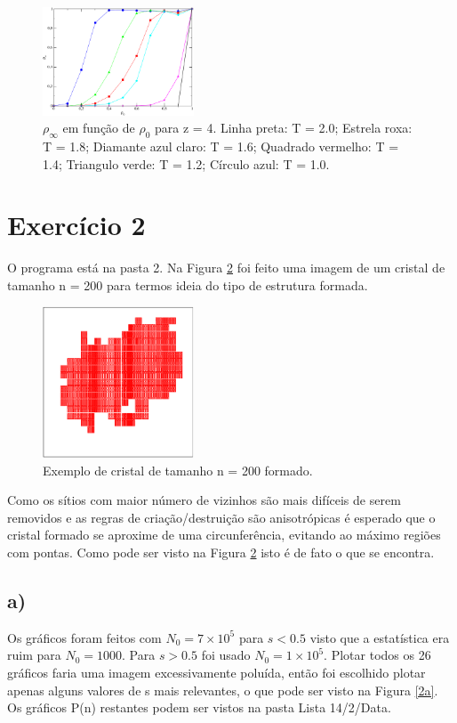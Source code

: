 \documentclass[a4wide]{report}
\begin{document}
\begin{figure}[!htb]
\centering
\includegraphics[width=0.4\textwidth]{infi.pdf}
\caption{$\rho_{\infty}$ em função de $\rho_{0}$ para z = 4. Linha preta: T = 2.0; Estrela roxa: T = 1.8; Diamante azul claro: T = 1.6; Quadrado vermelho: T = 1.4; Triangulo verde: T = 1.2; Círculo azul: T = 1.0. }
\label{1c}
\end{figure}


\section*{Exercício 2}
O programa está na pasta 2. Na Figura \ref{2aa} foi feito uma imagem de um cristal de tamanho n = 200 para termos ideia do tipo de estrutura formada.

\begin{figure}[!htb]
\centering
\includegraphics[width=0.4\textwidth]{cristal.pdf}
\caption{Exemplo de cristal de tamanho n = 200 formado.}
\label{2aa}
\end{figure}

Como os sítios com maior número de vizinhos são mais difíceis de serem removidos e as regras de criação/destruição são anisotrópicas é esperado que o cristal formado se aproxime de uma circunferência, evitando ao máximo regiões com pontas. Como pode ser visto na Figura \ref{2aa} isto é de fato o que se encontra.

\subsection*{a)}
Os gráficos foram feitos com $N_{0} = 7\times10^5$ para $s < 0.5$ visto que a estatística era ruim para $N_0 = 1000$. Para $s > 0.5$ foi usado $N_0 = 1\times10^5$. Plotar todos os 26 gráficos faria uma imagem excessivamente poluída, então foi escolhido plotar apenas alguns valores de s mais relevantes, o que pode ser visto na Figura \ref{2a}. Os gráficos P(n) restantes podem ser vistos na pasta Lista 14/2/Data. 
\end{document}
